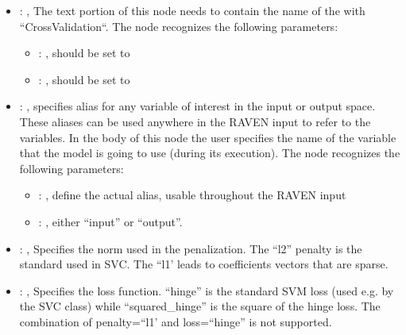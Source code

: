 \begin{itemize}
\begin{itemize}
        \item {}: ,
          List of IDs of features/variables to include in the transformation process.

        \item {}: ,
          Which space to search? Target or Feature?
      \end{itemize}

    \item {}: ,
      The text portion of this node needs to contain the name of the  with
               ``CrossValidation``.
      The  node recognizes the following parameters:
        \begin{itemize}
          \item {}: ,
            should be set to 
          \item {}: ,
            should be set to 
      \end{itemize}

    \item {}: ,
      specifies alias for         any variable of interest in the input or output space. These
      aliases can be used anywhere in the RAVEN input to         refer to the variables. In the body
      of this node the user specifies the name of the variable that the model is going to use
      (during its execution).
      The  node recognizes the following parameters:
        \begin{itemize}
          \item {}: ,
            define the actual alias, usable throughout the RAVEN input
          \item {}: ,
            either ``input'' or ``output''.
      \end{itemize}

    \item {}: \xmlDesc{[l1, l2]},
      Specifies the norm used in the penalization. The ``l2'' penalty is the standard used in SVC.
      The ``l1' leads to coefficients vectors that are sparse.

    \item {}: ,
      Specifies the loss function. ``hinge'' is the standard SVM loss (used e.g. by the SVC class)
      while ``squared\_hinge'' is the square of the hinge loss. The combination of penalty=``l1' and
      loss=``hinge''                                                  is not supported.


\end{itemize}
